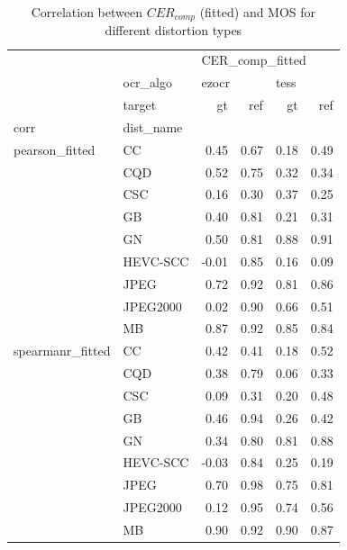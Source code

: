 \begin{table}[h]
\centering
\begin{tabular}{llrrrr}
\toprule
                 & {} & \multicolumn{4}{l}{CER\_comp\_fitted} \\
                 & ocr\_algo & \multicolumn{2}{l}{ezocr} & \multicolumn{2}{l}{tess} \\
                 & target &              \gls{gt} &   ref &    \gls{gt} &   ref \\
corr & dist\_name &                 &       &       &       \\
\midrule
pearson\_fitted & CC &            0.45 &  0.67 &  0.18 &  0.49 \\
                 & CQD &            0.52 &  0.75 &  0.32 &  0.34 \\
                 & CSC &            0.16 &  0.30 &  0.37 &  0.25 \\
                 & GB &            0.40 &  0.81 &  0.21 &  0.31 \\
                 & GN &            0.50 &  0.81 &  0.88 &  0.91 \\
                 & HEVC-SCC &           -0.01 &  0.85 &  0.16 &  0.09 \\
                 & JPEG &            0.72 &  0.92 &  0.81 &  0.86 \\
                 & JPEG2000 &            0.02 &  0.90 &  0.66 &  0.51 \\
                 & MB &            0.87 &  0.92 &  0.85 &  0.84 \\
spearmanr\_fitted & CC &            0.42 &  0.41 &  0.18 &  0.52 \\
                 & CQD &            0.38 &  0.79 &  0.06 &  0.33 \\
                 & CSC &            0.09 &  0.31 &  0.20 &  0.48 \\
                 & GB &            0.46 &  0.94 &  0.26 &  0.42 \\
                 & GN &            0.34 &  0.80 &  0.81 &  0.88 \\
                 & HEVC-SCC &           -0.03 &  0.84 &  0.25 &  0.19 \\
                 & JPEG &            0.70 &  0.98 &  0.75 &  0.81 \\
                 & JPEG2000 &            0.12 &  0.95 &  0.74 &  0.56 \\
                 & MB &            0.90 &  0.92 &  0.90 &  0.87 \\
\bottomrule
\end{tabular}
    \caption{Correlation between $CER_{comp}$ (fitted) and MOS for different distortion types}
\label{tab:pearson_spear_fitted}
\end{table}
    
